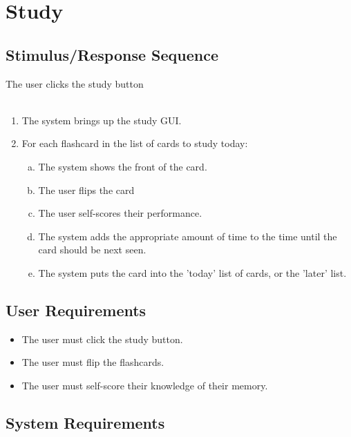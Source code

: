 \documentclass{scrreprt}
\begin{document}
\section{Study}
    \subsection{Stimulus/Response Sequence}
        \begin{flushleft}
             The user clicks the study button  \\
             \\
            \begin{enumerate}[1.]
                \item The system brings up the study GUI.
                \item For each flashcard in the list of cards to study today:
                \begin{enumerate}[a.]
                    \item The system shows the front of the card.
                    \item The user flips the card
                    \item The user self-scores their performance.
                    \item The system adds the appropriate amount of time to the time until the card should be next seen.
                    \item The system puts the card into the 'today' list of cards, or the 'later' list.
                \end{enumerate}
            \end{enumerate}
        \end{flushleft}

    \subsection{User Requirements}
        \begin{itemize}
            \item The user must click the study button.
            \item The user must flip the flashcards.
            \item The user must self-score their knowledge of their memory.
        \end{itemize}

    \subsection{System Requirements}
\end{document}
